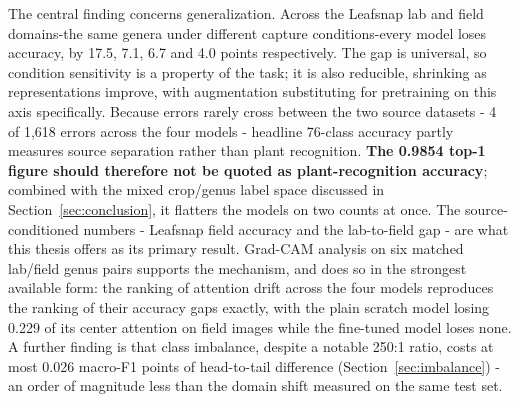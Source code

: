 \documentclass[12pt,a4paper]{article}
\begin{document}
The central finding concerns generalization. Across the Leafsnap lab and field domains-the same genera under different capture conditions-every model loses accuracy, by 17.5, 7.1, 6.7 and 4.0 points respectively. The gap is universal, so condition sensitivity is a property of the task; it is also reducible, shrinking as representations improve, with augmentation substituting for pretraining on this axis specifically. Because errors rarely cross between the two source datasets - 4 of 1{,}618 errors across the four models - headline 76-class accuracy partly measures source separation rather than plant recognition. \textbf{The 0.9854 top-1 figure should therefore not be quoted as plant-recognition accuracy}; combined with the mixed crop/genus label space discussed in Section~\ref{sec:conclusion}, it flatters the models on two counts at once. The source-conditioned numbers - Leafsnap field accuracy and the lab-to-field gap - are what this thesis offers as its primary result. Grad-CAM analysis on six matched lab/field genus pairs supports the mechanism, and does so in the strongest available form: the ranking of attention drift across the four models reproduces the ranking of their accuracy gaps exactly, with the plain scratch model losing 0.229 of its center attention on field images while the fine-tuned model loses none. A further finding is that class imbalance, despite a notable 250:1 ratio, costs at most 0.026 macro-F1 points of head-to-tail difference (Section~\ref{sec:imbalance}) - an order of magnitude less than the domain shift measured on the same test set.
\end{document}

